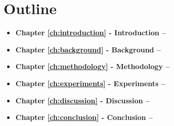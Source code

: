 \section{Outline}
\begin{itemize}
    \item \textbf{Chapter \ref{ch:introduction} - Introduction --}
    \item \textbf{Chapter \ref{ch:background} - Background --}
    \item \textbf{Chapter \ref{ch:methodology} - Methodology --}
    \item \textbf{Chapter \ref{ch:experiments} - Experiments --}
    \item \textbf{Chapter \ref{ch:discussion} - Discussion --}
    \item \textbf{Chapter \ref{ch:conclusion} - Conclusion --}
\end{itemize}
